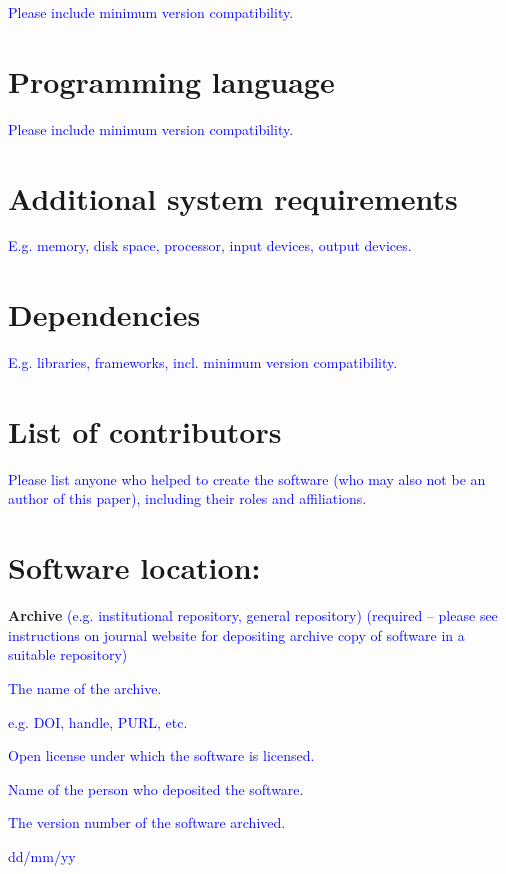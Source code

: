 \documentclass{jors}
\begin{document}
\textcolor{blue}{Please include minimum version compatibility.}

\section*{Programming language}

\textcolor{blue}{Please include minimum version compatibility.}

\section*{Additional system requirements}

\textcolor{blue}{E.g. memory, disk space, processor, input devices, output devices.}

\section*{Dependencies}

\textcolor{blue}{E.g. libraries, frameworks, incl. minimum version compatibility.}

\section*{List of contributors}

\textcolor{blue}{Please list anyone who helped to create the software (who may also not be an author of this paper), including their roles and affiliations.}

\section*{Software location:}

{\bf Archive} \textcolor{blue}{(e.g. institutional repository, general repository) (required – please see instructions on journal website for depositing archive copy of software in a suitable repository)}

\begin{description}[noitemsep,topsep=0pt]
	\item[Name:] \textcolor{blue}{The name of the archive.}
	\item[Persistent identifier:] \textcolor{blue}{e.g. DOI, handle, PURL, etc.}
	\item[Licence:] \textcolor{blue}{Open license under which the software is licensed.}
	\item[Publisher:]  \textcolor{blue}{Name of the person who deposited the software.}
	\item[Version published:] \textcolor{blue}{The version number of the software archived.}
	\item[Date published:] \textcolor{blue}{dd/mm/yy}
\end{description}
\end{document}
